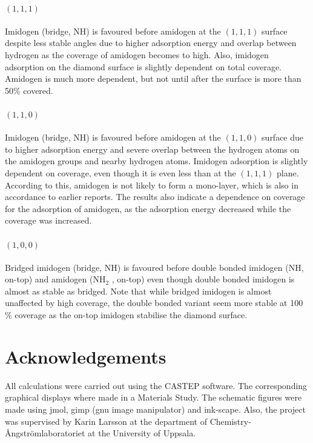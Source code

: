 \documentclass[10pt,a4paper]{article}
\begin{document}
\paragraph*{$(1,  1, 1)$} Imidogen (bridge, NH) is favoured before amidogen at the $(1,  1, 1)$ surface despite less stable angles due to higher adsorption energy and overlap between hydrogen as the coverage of amidogen becomes to high. Also, imidogen adsorption on the diamond surface is slightly dependent on total coverage. Amidogen is much more dependent, but not until after the surface is more than 50\% covered. 
\paragraph*{$(1,  1,  0)$} Imidogen (bridge, NH) is favoured before amidogen at the $(1,  1,  0)$ surface due to higher adsorption energy and severe overlap between the hydrogen atoms on the amidogen groups and nearby hydrogen atoms. Imidogen adsorption is slightly dependent on coverage, even though it is even less than at the $(1,  1, 1)$ plane. According to this, amidogen is not likely to form a mono-layer, which is also in accordance to earlier reports. The results also indicate a dependence on coverage for the adsorption of amidogen, as the adsorption energy decreased while the coverage was increased. 
\paragraph*{$(1,  0,  0)$} Bridged imidogen (bridge, NH) is favoured before double bonded imidogen (NH, on-top) and amidogen (NH$_2$ , on-top) even though double bonded imidogen is almost as stable as bridged. Note that while bridged imidogen is almost unaffected by high coverage, the double bonded variant seem more stable at 100 \% coverage as the on-top imidogen stabilise the diamond surface.



\section*{Acknowledgements}
All calculations were carried out using the CASTEP software. The corresponding graphical displays where made in a Materials Study. The schematic figures were made using jmol, gimp (gnu image manipulator) and ink-scape.  Also, the project was supervised by Karin Larsson at the department of Chemistry-Ångströmlaboratoriet at the University of Uppsala.

\printbibliography
\appendix 
\end{document}
